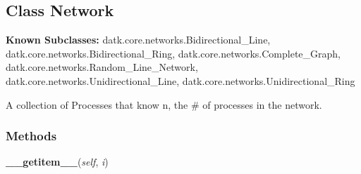 

\subsection{Class Network}

    \label{datk:core:distalgs:Network}
\textbf{Known Subclasses:}
datk.core.networks.Bidirectional\_Line,
    datk.core.networks.Bidirectional\_Ring,
    datk.core.networks.Complete\_Graph,
    datk.core.networks.Random\_Line\_Network,
    datk.core.networks.Unidirectional\_Line,
    datk.core.networks.Unidirectional\_Ring

A collection of Processes that know n, the \# of processes in the network.



  \subsubsection{Methods}

    \label{datk:core:distalgs:Network:__getitem__}

    \vspace{0.5ex}

\hspace{.8\funcindent}\begin{boxedminipage}{\funcwidth}

    \raggedright \textbf{\_\_getitem\_\_}(\textit{self}, \textit{i})

\setlength{\parskip}{2ex}
\setlength{\parskip}{1ex}
    \end{boxedminipage}


